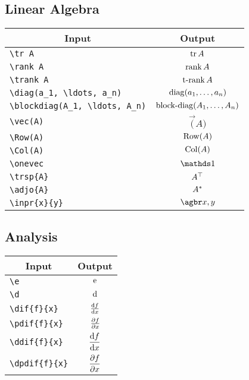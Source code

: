 \documentclass[a4paper, 11pt]{article}
\begin{document}
\subsection{Linear Algebra}
\begin{center}
  \begin{tabular}{lc} \toprule
    \multicolumn{1}{c}{Input} & Output                         \\\midrule
    \verb|\tr A|   & $\operatorname{tr} A$                        \\
    \verb|\rank A|   & $\operatorname{rank} A$                      \\
    \verb|\trank A|   & $\operatorname{t-rank} A$                     \\
    \verb|\diag(a_1, \ldots, a_n)|   & $\operatorname{diag}(a_1, \ldots, a_n)$      \\
    \verb|\blockdiag(A_1, \ldots, A_n)|   & $\operatorname{block-diag}(A_1, \ldots, A_n)$ \\
    \verb|\vec(A)|   & $\vec(A)$                      \\
    \verb|\Row(A)|   & $\operatorname{Row}(A)$                      \\
    \verb|\Col(A)|   & $\operatorname{Col}(A)$                      \\
    \verb|\onevec|   & $\onevec$                      \\
    \verb|\trsp{A}|   & $A^{\top}$                     \\
    \verb|\adjo{A}|   & $A^{*}$                     \\
    \verb|\inpr{x}{y}|   & $\inpr{x}{y}$                  \\
    \bottomrule
  \end{tabular}
\end{center}

\subsection{Analysis}
\begin{center}
  \begin{tabular}{lc} \toprule
    \multicolumn{1}{c}{Input} & Output         \\\midrule
    \verb|\e|   & $\mathrm{e}$           \\
    \verb|\d|   & $\mathrm{d}$           \\
    \verb|\dif{f}{x}|   & $\frac{\mathrm{d}{f}}{\mathrm{d}{x}}$   \\
    \verb|\pdif{f}{x}|   & $\frac{\partial{f}}{\partial{x}}$  \\
    \verb|\ddif{f}{x}|   & $\dfrac{\mathrm{d}{f}}{\mathrm{d}{x}}$  \\
    \verb|\dpdif{f}{x}|   & $\dfrac{\partial{f}}{\partial{x}}$ \\
    \bottomrule
  \end{tabular}
\end{center}
\end{document}
